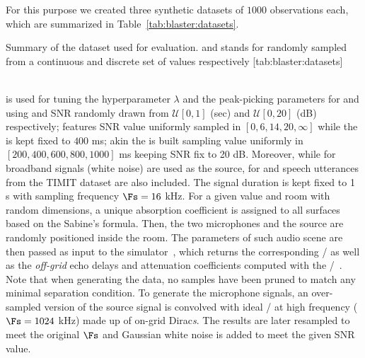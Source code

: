 \mynewline
For this purpose we created three synthetic datasets of $1000$ observations each, which are summarized in Table~\cref{tab:blaster:datasets}.
\begin{table}[ht]
    \begin{sidecaption}[]{
        Summary of the dataset used for evaluation.  and  stands for randomly sampled from a continuous and discrete set of values respectively
    }[tab:blaster:datasets]
    \centering
    \small
    
    \end{sidecaption}
\end{table}
\\\dsetValid{} is used for tuning the hyperparameter $\lambda$ and the peak-picking parameters for \algoCrocco{} and \algoBsn{} using \RT{} and SNR randomly drawn from $\mathcal{U}[0, 1]$ (sec) and $\mathcal{U}[0, 20]$ (dB) respectively; \dsetSNR{} features SNR value uniformly sampled in $[0, 6, 14, 20, \infty]$ while the \RT{} is kept fixed to $400$ ms; akin the \dsetRT{} is built sampling \RT{} value uniformly in $[200, 400, 600, 800, 1000]$ ms keeping SNR fix to 20 dB.
Moreover, while for \dsetValid{} broadband signals (white noise) are used as the source, for \dsetSNR{} and \dsetRT{} speech utterances from the TIMIT dataset are also included.
The signal duration is kept fixed to 1 s with sampling frequency $\Fs = 16$ kHz.
For a given \RT{} value and room with random dimensions, a unique absorption coefficient is assigned to all surfaces based on the Sabine's formula.
Then, the two microphones and the source are randomly positioned inside the room.
The parameters of such audio scene are then passed as input to the \pyroomacoustics{} simulator~, which returns the corresponding \RIRs/ as well as the \textit{off-grid} echo delays and attenuation coefficients computed with the \ISMdef/~.
Note that when generating the data, no samples have been pruned to match any minimal separation condition.
To generate the microphone signals, an over-sampled version of the source signal is convolved with ideal \RIRs/ at high frequency ($\Fs=1024$ kHz) made up of on-grid Dirac\textit{s}. The results are later resampled to meet the original $\Fs$ and Gaussian white noise is added to meet the given SNR value.

